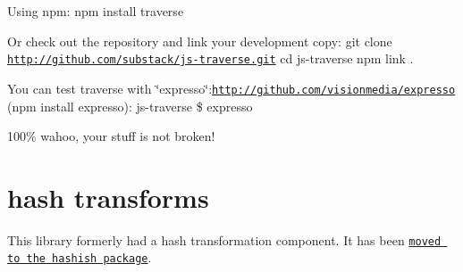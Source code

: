 Using npm\+: npm install traverse

Or check out the repository and link your development copy\+: git clone \href{http://github.com/substack/js-traverse.git}{\tt http\+://github.\+com/substack/js-\/traverse.\+git} cd js-\/traverse npm link .

You can test traverse with \char`\"{}expresso\char`\"{}\+:\href{http://github.com/visionmedia/expresso}{\tt http\+://github.\+com/visionmedia/expresso} ({\ttfamily npm install expresso})\+: js-\/traverse \$ expresso

100\% wahoo, your stuff is not broken!

\section*{hash transforms }

This library formerly had a hash transformation component. It has been \href{https://github.com/substack/node-hashish}{\tt moved to the hashish package}. 